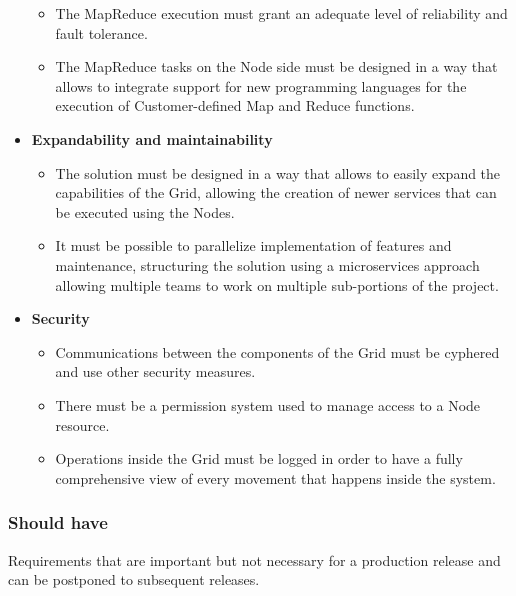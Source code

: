\begin{itemize}
    \begin{itemize}
        \item The MapReduce execution must grant an adequate level of reliability and fault tolerance.
        \item The MapReduce tasks on the Node side must be designed in a way that allows to integrate support for new programming  languages for the execution of Customer-defined Map and Reduce functions.
    \end{itemize}
    \item \textbf{Expandability and maintainability}
    \begin{itemize}
        \item The solution must be designed in a way that allows to easily expand the capabilities of the Grid, allowing the creation of newer services that can be executed using the Nodes.
        \item It must be possible to parallelize implementation of features and maintenance, structuring the solution using a microservices approach allowing multiple teams to work on multiple sub-portions of the project.
    \end{itemize}
    \item \textbf{Security}
    \begin{itemize}
        \item Communications between the components of the Grid must be cyphered and use other security measures.
        \item There must be a permission system used to manage access to a Node resource.
        \item Operations inside the Grid must be logged in order to have a fully comprehensive view of every movement that happens inside the system.
    \end{itemize}
\end{itemize}

\subsubsection{Should have}
Requirements that are important but not necessary for a production release and can be postponed to subsequent releases.

